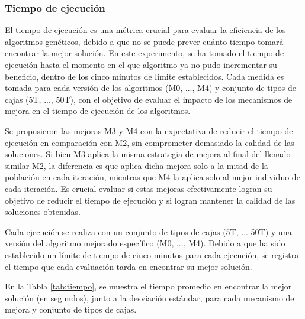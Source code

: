 \documentclass[openany]{article}
\begin{document}
\subsubsection{Tiempo de ejecución}

El tiempo de ejecución es una métrica crucial para evaluar la eficiencia de los algoritmos genéticos, debido a que no se puede prever cuánto tiempo tomará encontrar la mejor solución. En este experimento, se ha tomado el tiempo de ejecución hasta el momento en el que algoritmo ya no pudo incrementar su beneficio, dentro de los cinco minutos de límite establecidos. Cada medida es tomada para cada versión de los algoritmos (M0, ..., M4) y conjunto de tipos de cajas (5T, ..., 50T), con el objetivo de evaluar el impacto de los mecanismos de mejora en el tiempo de ejecución de los algoritmos.

Se propusieron las mejoras M3 y M4 con la expectativa de reducir el tiempo de ejecución en comparación con M2, sin comprometer demasiado la calidad de las soluciones. Si bien M3 aplica la misma estrategia de mejora al final del llenado similar M2, la diferencia es que aplica dicha mejora solo a la mitad de la población en cada iteración, mientras que M4 la aplica solo al mejor individuo de cada iteración. Es crucial evaluar si estas mejoras efectivamente logran su objetivo de reducir el tiempo de ejecución y si logran mantener la calidad de las soluciones obtenidas.

Cada ejecución se realiza con un conjunto de tipos de cajas (5T, ... 50T) y una versión del algoritmo mejorado específico (M0, ..., M4). Debido a que ha sido establecido un límite de tiempo de cinco minutos para cada ejecución, se registra el tiempo que cada evaluación tarda en encontrar su mejor solución.

En la Tabla \ref{tab:tiempo}, se muestra el tiempo promedio en encontrar la mejor solución (en segundos), junto a la desviación estándar, para cada mecanismo de mejora y conjunto de tipos de cajas.
\end{document}

